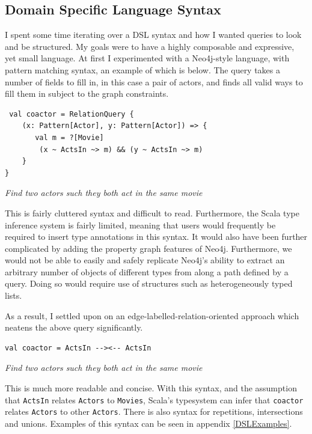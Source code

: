 \documentclass[12pt,a4paper,twoside,openright]{report}
\newcommand\codeName[1]{\texttt{#1}}
\newcommand\note[1]{\textit{#1}}
\renewcommand{\baselinestretch}{1.1}    %
\begin{document}
\subsection{Domain Specific Language Syntax}
I spent some time iterating over a DSL syntax and how I wanted queries to look and be structured. My goals were to have a highly composable and expressive, yet small language. At first I experimented with a Neo4j-style language, with pattern matching syntax, an example of which is below. The query takes a number of fields to fill in, in this case a pair of actors, and finds all valid ways to fill them in subject to the graph constraints.
\renewcommand{\baselinestretch}{0.8}
\begin{framed}
\begin{verbatim}
 val coactor = RelationQuery {
    (x: Pattern[Actor], y: Pattern[Actor]) => {
       val m = ?[Movie]
        (x ~ ActsIn ~> m) && (y ~ ActsIn ~> m)
    }
}
\end{verbatim}
\note{Find two actors such they both act in the same movie}
\end{framed}
\renewcommand{\baselinestretch}{1.1}
This is fairly cluttered syntax and difficult to read. Furthermore, the Scala type inference system is fairly limited, meaning that users would frequently be required to insert type annotations in this syntax. It would also have been further complicated by adding the property graph features of Neo4j. Furthermore, we would not be able to easily and safely replicate Neo4j's ability to extract an arbitrary number of objects of different types from along a path defined by a query. Doing so would require use of structures such as heterogeneously typed lists.

As a result, I settled upon on an edge-labelled-relation-oriented approach which neatens the above query significantly.

\renewcommand{\baselinestretch}{0.8}
\begin{framed}
\begin{verbatim}
val coactor = ActsIn --><-- ActsIn
\end{verbatim}
\note{Find two actors such they both act in the same movie}
\end{framed}
\renewcommand{\baselinestretch}{1.1}

This is much more readable and concise. With this syntax, and the assumption that \codeName{ActsIn} relates \codeName{Actors} to \codeName{Movies}, Scala's typesystem can infer that \codeName{coactor} relates \codeName{Actors} to other \codeName{Actors}. There is also syntax for repetitions, intersections and unions. Examples of this syntax can be seen in appendix \ref{DSLExamples}.
\end{document}
